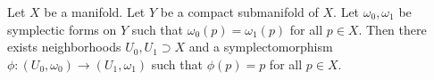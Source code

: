 

    Let $X$ be a manifold. Let $Y$ be a compact submanifold of $X$. 
    Let $\omega_0,  \omega_1$ be symplectic forms on $Y$ such that $\omega_0(p)=\omega_1(p)$ for all $p\in X$.
    Then there exists neighborhoods $U_0,  U_1\supset X$ and a symplectomorphism $\phi:(U_0,  \omega_0)\to (U_1,  \omega_1)$ such that $\phi(p)=p$ for all $p\in X$.